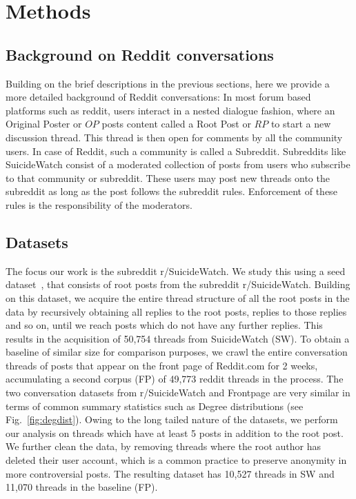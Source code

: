 \section{Methods}
\label{section:methods}
\subsection{Background on Reddit conversations}
Building on the brief descriptions in the previous sections, here we provide a more detailed background of Reddit conversations: In most forum based platforms such as reddit,  users interact in a nested dialogue fashion, where an Original Poster or $OP$ posts content called a Root Post or $RP$ to start  a new discussion thread. This thread is then open for comments by all the community users. In case of Reddit, such a community is called a Subreddit. Subreddits like SuicideWatch consist of a moderated collection of posts from users who subscribe to that community or subreddit. These users may post new threads onto the subreddit as long as the post follows the subreddit rules. Enforcement of these rules is the responsibility of the moderators. %

\subsection{Datasets} \label{sec:data}
The focus our work is the subreddit r/SuicideWatch. We study this using a seed dataset~\cite{gkotsis2017characterisation}, that consists of root posts from the subreddit r/SuicideWatch. Building on this dataset, we acquire the entire thread structure of all the root posts in the data by recursively obtaining all replies to the root posts, replies to those replies and so on, until we reach posts which do not have any further replies. This results in the acquisition of 50,754 threads from SuicideWatch (SW). To obtain a baseline of similar size for comparison purposes, we crawl the entire conversation threads of posts that appear on the front page of Reddit.com  for 2 weeks,  accumulating a second corpus (FP) of 49,773 reddit threads in the process. 
%
The two conversation datasets from r/SuicideWatch and Frontpage are very similar in terms of common summary statistics such as Degree distributions (see Fig.~\ref{fig:degdist}). 
Owing to the long tailed nature of the datasets, we perform our analysis on threads  which have at least 5 posts in addition to the root post.
We further clean the data, by removing threads where the root author has deleted their user account, which is a common practice to preserve anonymity in more controversial posts. The resulting dataset has 10,527 threads in SW and 11,070 threads in the baseline (FP). 

